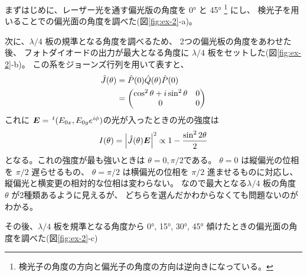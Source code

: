 \documentclass[9pt,dvipdfmx,a4paper]{jsarticle}
\begin{document}
まずはじめに、レーザー光を通す偏光版の角度を \ang{0} と \ang{45}
\footnote{検光子の角度の方向と偏光子の角度の方向は逆向きになっている。} にし、
検光子を用いることでの偏光面の角度を調べた(図\ref{fig:ex-2}-a)。

次に、\(\lambda/4\) 板の規準となる角度を調べるため、
2つの偏光板の角度をあわせた後、
フォトダイオードの出力が最大となる角度に \(\lambda/4\) 板をセットした(図\ref{fig:ex-2}-b)。
この系をジョーンズ行列を用いて表すと、
\begin{align}
    \hat{J}(\theta) &= \hat{P}(0)\hat{Q}(\theta)\hat{P}(0) \notag\\
    &=\begin{pmatrix}
        \cos^2\theta + i\sin^2\theta  & 0\\
        0 & 0
    \end{pmatrix}
\end{align}
これに \(\vb*{E}=\,^t(E_{0x},E_{0y}e^{i\phi})\)の光が入ったときの光の強度は %
\begin{align}
    I(\theta) = \abs{\hat{J}(\theta)\vb*{E}}^2 \propto 1 -\frac{\sin^2 2\theta}{2}
\end{align}
となる。これの強度が最も強いときは \(\theta=0,\pi/2\)である。
\(\theta=0\) は縦偏光の位相を \(\pi/2\) 遅らせるもの、
\(\theta=\pi/2\) は横偏光の位相を \(\pi/2\) 進ませるものに対応し、
縦偏光と横変更の相対的な位相は変わらない。
なので最大となる\(\lambda/4\) 板の角度 \(\theta\) が2種類あるように見えるが、
どちらを選んだかわからなくても問題ないのがわかる。

その後、\(\lambda/4\) 板を規準となる角度から \ang{0}, \ang{15}, \ang{30}, \ang{45}
傾けたときの偏光面の角度を調べた(図\ref{fig:ex-2}-c)
\end{document}
